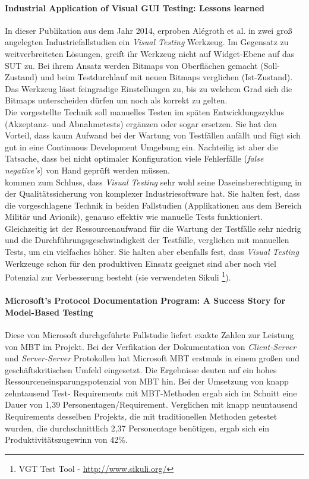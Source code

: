 \paragraph{Industrial Application of Visual GUI Testing: Lessons learned \cite{alegroth_industrial_2014}}In dieser Publikation aus dem Jahr 2014, erproben Alégroth et al. in zwei groß angelegten Industriefallstudien ein \textit{Visual Testing} Werkzeug. Im Gegensatz zu weitverbreiteten Lösungen, greift ihr Werkzeug nicht auf Widget-Ebene auf das SUT zu. Bei ihrem Ansatz werden Bitmaps von Oberflächen gemacht (Soll-Zustand) und beim Testdurchlauf mit neuen Bitmaps verglichen (Ist-Zustand). Das Werkzeug lässt feingradige Einstellungen zu, bis zu welchem Grad sich die Bitmaps unterscheiden dürfen um noch als korrekt zu gelten.\\
Die vorgestellte Technik soll manuelles Testen im späten Entwicklungszyklus (Akzeptanz- und Abnahmetests) ergänzen oder sogar ersetzen. Sie hat den Vorteil, dass kaum Aufwand bei der Wartung von Testfällen anfällt und fügt sich gut in eine Continuous Development Umgebung ein. Nachteilig ist aber die Tatsache, dass bei nicht optimaler Konfiguration viele Fehlerfälle (\textit{false negative's}) von Hand geprüft werden müssen.\\
\citeauthor{alegroth_industrial_2014} kommen zum Schluss, dass \textit{Visual Testing} sehr wohl seine Daseinsberechtigung in der Qualitätssicherung von komplexer Industriesoftware hat. Sie halten fest, dass die vorgeschlagene Technik in beiden Fallstudien (Applikationen aus dem Bereich Militär und Avionik), genauso effektiv wie manuelle Tests funktioniert. Gleichzeitig ist der Ressourcenaufwand für die Wartung der Testfälle sehr niedrig und die Durchführungsgeschwindigkeit der Testfälle, verglichen mit manuellen Tests, um ein vielfaches höher. Sie halten aber ebenfalls fest, dass \textit{Visual Testing} Werkzeuge schon für den produktiven Einsatz geeignet sind aber noch viel Potenzial zur Verbesserung besteht (sie verwendeten Sikuli \footnote{VGT Test Tool - \url{http://www.sikuli.org/}}).

\paragraph{Microsoft’s Protocol Documentation Program: A Success Story for Model-Based Testing\cite{grieskamp_microsofts_2010}}\label{sec:microsoft_fallstudie}
Diese von Microsoft durchgeführte Fallstudie liefert exakte Zahlen zur Leistung von MBT im Projekt. Bei der Verfikation der Dokumentation von \textit{Client-Server} und \textit{Server-Server} Protokollen hat Microsoft MBT erstmals in einem großen und geschäftskritischen Umfeld eingesetzt. Die Ergebnisse deuten auf ein hohes Ressourceneinsparungspotenzial von MBT hin. Bei der Umsetzung von knapp zehntausend Test- Requirements mit MBT-Methoden ergab sich im Schnitt eine Dauer von 1,39 Personentagen/Requirement. Verglichen mit knapp neuntausend Requirements desselben Projekts, die mit traditionellen Methoden getestet wurden, die durchschnittlich 2,37 Personentage benötigen, ergab sich ein Produktivitätszugewinn von 42\%.

